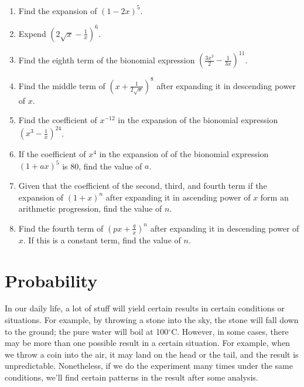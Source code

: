 \documentclass{report}
\begin{document}
\begin{multicols}{2}
  \begin{enumerate}
    \item Find the expansion of $(1 - 2x)^5$.

    \item Expend $\left(2\sqrt{x} - \frac{1}{x}\right)^6$.

    \item Find the eighth term of the bionomial expression $\left(\frac{3x^2}{2} -
            \frac{1}{3x}\right)^{11}$.

    \item Find the middle term of $\left(x+\frac{1}{2\sqrt{x}}\right)^8$ after expanding
          it in descending power of $x$.

    \item Find the coefficient of $x^{-12}$ in the expansion of the bionomial expression
          $\left(x^3 - \frac{1}{x}\right)^{24}$.

    \item If the coefficient of $x^4$ in the expansion of of the bionomial expression $(1
            + ax)^5$ is 80, find the value of $a$.

    \item Given that the coefficient of the second, third, and fourth term if the
          expansion of $(1 + x)^n$ after expanding it in ascending power of $x$ form an
          arithmetic progression, find the value of $n$.

    \item Find the fourth term of $\left(px + \frac{q}{x}\right)^n$ after expanding it in
          descending power of $x$. If this is a constant term, find the value of $n$.
  \end{enumerate}

  \chapter{Probability}

  In our daily life, a lot of stuff will yield certain results in certain
  conditions or situations. For example, by throwing a stone into the sky, the
  stone will fall down to the ground; the pure water will boil at 100$^\circ$C.
  However, in some cases, there may be more than one possible result in a certain
  situation. For example, when we throw a coin into the air, it may land on the
  head or the tail, and the result is unpredictable. Nonetheless, if we do the
  experiment many times under the same conditions, we'll find certain patterns in
  the result after some analysis.


\end{multicols}
\end{document}
